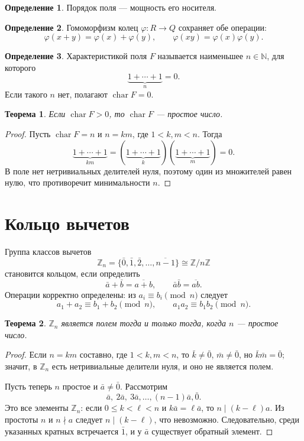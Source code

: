 \documentclass[12pt,a4paper,oneside,openany]{book}
\theoremstyle{definition}
\newtheorem{definition}{Определение}[chapter]
\theoremstyle{plain}
\newtheorem{theorem}{Теорема}[chapter]
\theoremstyle{remark}
\newcommand{\N}{\mathbb{N}}
\newcommand{\Z}{\mathbb{Z}}
\begin{document}
\begin{definition}
Порядок поля --- мощность его носителя.
\end{definition}

\begin{definition}
Гомоморфизм колец $\varphi\colon R\to Q$ сохраняет обе операции:
\[
  \varphi(x+y)=\varphi(x)+\varphi(y),
  \qquad
  \varphi(xy)=\varphi(x)\varphi(y).
\]
\end{definition}


\begin{definition}
Характеристикой поля $F$ называется наименьшее $n\in\N$, для которого
\[
  \underbrace{1+\cdots+1}_{n}=0.
\]
Если такого $n$ нет, полагают $\operatorname{char}F=0$.
\end{definition}

\begin{theorem}
Если $\operatorname{char}F>0$, то $\operatorname{char}F$ --- простое
число.
\end{theorem}

\begin{proof}
Пусть $\operatorname{char}F=n$ и $n=km$, где $1<k,m<n$. Тогда
\[
  \underbrace{1+\cdots+1}_{km}
  =\left(\underbrace{1+\cdots+1}_{k}\right)
   \left(\underbrace{1+\cdots+1}_{m}\right)=0.
\]
В поле нет нетривиальных делителей нуля, поэтому один из множителей равен
нулю, что противоречит минимальности $n$.
\end{proof}

\section{Кольцо вычетов}

Группа классов вычетов
\[
  \Z_n=\{\bar0,\bar1,\bar2,\ldots,\overline{n-1}\}
  \cong\Z/n\Z
\]
становится кольцом, если определить
\[
  \bar a+\bar b=\overline{a+b},
  \qquad
  \bar a\bar b=\overline{ab}.
\]
Операции корректно определены: из $a_i\equiv b_i\pmod n$ следует
\[
  a_1+a_2\equiv b_1+b_2\pmod n,
  \qquad
  a_1a_2\equiv b_1b_2\pmod n.
\]

\begin{theorem}
$\Z_n$ является полем тогда и только тогда, когда $n$ --- простое число.
\end{theorem}

\begin{proof}
Если $n=km$ составно, где $1<k,m<n$, то
$\bar k\ne\bar0$, $\bar m\ne\bar0$, но $\bar k\bar m=\bar0$; значит,
в $\Z_n$ есть нетривиальные делители нуля, и оно не является полем.


Пусть теперь $n$ простое и $\bar a\ne\bar0$. Рассмотрим
\[
  \bar a,\ 2\bar a,\ 3\bar a,\ldots,(n-1)\bar a,\bar0.
\]
Это все элементы $\Z_n$: если $0\leq k<\ell<n$ и
$k\bar a=\ell\bar a$, то $n\mid(k-\ell)a$. Из простоты $n$ и
$n\nmid a$ следует $n\mid(k-\ell)$, что невозможно. Следовательно,
среди указанных кратных встречается $\bar1$, и у $\bar a$ существует
обратный элемент.
\end{proof}
\end{document}
